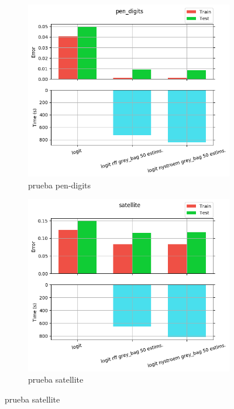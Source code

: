 \begin{figure}[ht]
  \centering
  \begin{subfigure}[b]{0.5\linewidth}
    \centering\includegraphics[width=\imgscale\linewidth]{Figures/2_3/pen_digits}
    \caption{prueba pen-digits}
    \label{fig:2_3_pen_digits}
  \end{subfigure}%
  \begin{subfigure}[b]{0.5\linewidth}
    \centering\includegraphics[width=\imgscale\linewidth]{Figures/2_3/satellite}
    \caption{prueba satellite}
    \label{fig:2_3_satellite}
  \end{subfigure}
\end{figure}

